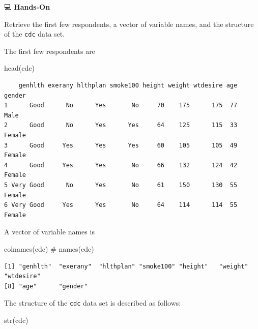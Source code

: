 \documentclass[
  letterpaper,
  DIV=11,
  numbers=noendperiod]{scrreprt}
\newenvironment{Shaded}{\begin{snugshade}}{\end{snugshade}}
\newcommand{\CommentTok}[1]{\textcolor[rgb]{0.37,0.37,0.37}{#1}}
\newcommand{\FunctionTok}[1]{\textcolor[rgb]{0.28,0.35,0.67}{#1}}
\newcommand{\NormalTok}[1]{\textcolor[rgb]{0.00,0.23,0.31}{#1}}
\begin{document}
💻 \textbf{Hands-On}

Retrieve the first few respondents, a vector of variable names, and the
structure of the \texttt{cdc} data set.

\begin{tcolorbox}[enhanced jigsaw, colbacktitle=quarto-callout-tip-color!10!white, opacitybacktitle=0.6, breakable, left=2mm, leftrule=.75mm, toprule=.15mm, toptitle=1mm, bottomtitle=1mm, colframe=quarto-callout-tip-color-frame, opacityback=0, coltitle=black, arc=.35mm, titlerule=0mm, colback=white, bottomrule=.15mm, title=\textcolor{quarto-callout-tip-color}{\faLightbulb}\hspace{0.5em}{Answer}, rightrule=.15mm]

The first few respondents are

\begin{Shaded}
\begin{Highlighting}[]
\FunctionTok{head}\NormalTok{(cdc)}
\end{Highlighting}
\end{Shaded}

\begin{verbatim}
    genhlth exerany hlthplan smoke100 height weight wtdesire age gender
1      Good      No      Yes       No     70    175      175  77   Male
2      Good      No      Yes      Yes     64    125      115  33 Female
3      Good     Yes      Yes      Yes     60    105      105  49 Female
4      Good     Yes      Yes       No     66    132      124  42 Female
5 Very Good      No      Yes       No     61    150      130  55 Female
6 Very Good     Yes      Yes       No     64    114      114  55 Female
\end{verbatim}

A vector of variable names is

\begin{Shaded}
\begin{Highlighting}[]
\FunctionTok{colnames}\NormalTok{(cdc)    }\CommentTok{\# names(cdc)}
\end{Highlighting}
\end{Shaded}

\begin{verbatim}
[1] "genhlth"  "exerany"  "hlthplan" "smoke100" "height"   "weight"   "wtdesire"
[8] "age"      "gender"  
\end{verbatim}

The structure of the \texttt{cdc} data set is described as follows:

\begin{Shaded}
\begin{Highlighting}[]
\FunctionTok{str}\NormalTok{(cdc)}
\end{Highlighting}
\end{Shaded}


\end{tcolorbox}
\end{document}
